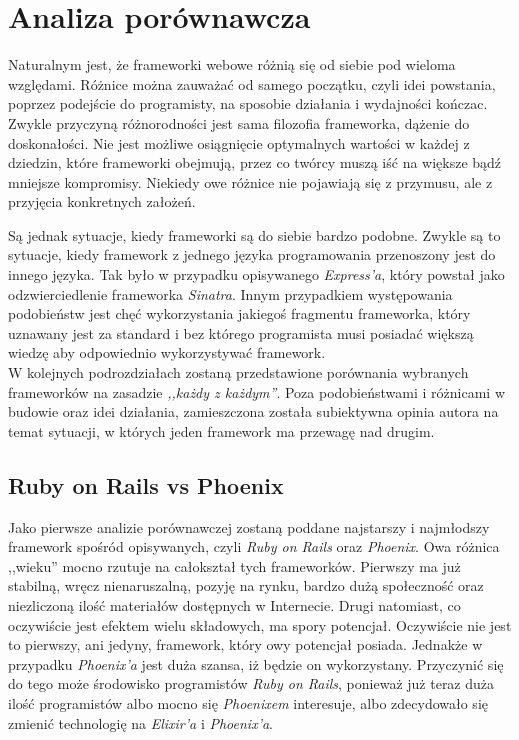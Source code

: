 \chapter{Analiza porównawcza}
Naturalnym jest, że frameworki webowe różnią się od siebie pod wieloma względami. Różnice można zauważać od samego początku, czyli idei powstania, poprzez podejście do programisty, na sposobie działania i wydajności kończac. Zwykle przyczyną różnorodności jest sama filozofia frameworka, dążenie do doskonałości. Nie jest możliwe osiągnięcie optymalnych wartości w każdej z dziedzin, które frameworki obejmują, przez co twórcy muszą iść na większe bądź mniejsze kompromisy. Niekiedy owe różnice nie pojawiają się z przymusu, ale z przyjęcia konkretnych założeń.

Są jednak sytuacje, kiedy frameworki są do siebie bardzo podobne. Zwykle są to sytuacje, kiedy framework z jednego języka programowania przenoszony jest do innego języka. Tak było w przypadku opisywanego \textit{Express'a}, który powstał jako odzwierciedlenie frameworka \textit{Sinatra}. Innym przypadkiem występowania podobieństw jest chęć wykorzystania jakiegoś fragmentu frameworka, który uznawany jest za standard i bez którego programista musi posiadać większą wiedzę aby odpowiednio wykorzystywać framework.\\

W kolejnych podrozdziałach zostaną przedstawione porównania wybranych frameworków na zasadzie \textit{,,każdy z każdym''}. Poza podobieństwami i różnicami w budowie oraz idei działania, zamieszczona została subiektywna opinia autora na temat sytuacji, w których jeden framework ma przewagę nad drugim.

\section{Ruby on Rails vs Phoenix}
Jako pierwsze analizie porównawczej zostaną poddane najstarszy i najmłodszy framework spośród opisywanych, czyli \textit{Ruby on Rails} oraz \textit{Phoenix}. Owa różnica ,,wieku'' mocno rzutuje na całokształ tych frameworków.  Pierwszy ma już stabilną, wręcz nienaruszalną, pozyję na rynku, bardzo dużą społeczność oraz niezliczoną ilość materiałów dostępnych w Internecie.
Drugi natomiast, co oczywiście jest efektem wielu składowych, ma spory potencjał. Oczywiście nie jest to pierwszy, ani jedyny, framework, który owy potencjał posiada. Jednakże w przypadku \textit{Phoenix'a} jest duża szansa, iż będzie on wykorzystany. Przyczynić się do tego może środowisko programistów \textit{Ruby on Rails}, ponieważ już teraz duża ilość programistów albo mocno się \textit{Phoenixem} interesuje, albo zdecydowało się zmienić technologię na \textit{Elixir'a} i \textit{Phoenix'a}.

